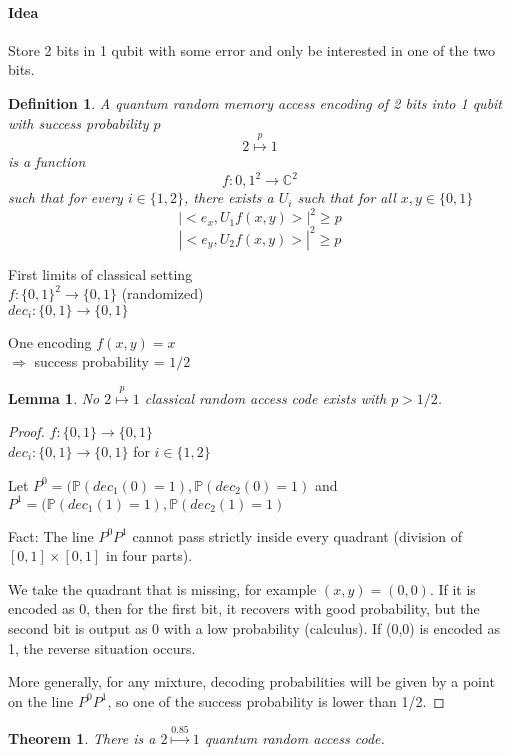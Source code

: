 \documentclass{article}
\newtheorem{thm}{Theorem}
\newtheorem{lemma}{Lemma}
\newtheorem{defi}{Definition}
\begin{document}
\paragraph{Idea}
Store 2 bits in 1 qubit with some error and only be interested in one of the two bits.

\begin{defi}
A quantum random memory access encoding of 2 bits into 1 qubit with success probability $p$
\[2 \overset{p}{\mapsto} 1\]
is a function 
\[f:{0,1}^2\to \mathbb{C}^2\]
such that for every $i\in \{1,2\}$, there exists a $U_i$ such that for all $x,y\in \{0,1\}$
\[|<e_x,U_1f(x,y)>|^2\geq p\]
\[|<e_y,U_2f(x,y)>|^2\geq p\]
\end{defi}



First limits of classical setting\\
$f:\{0,1\}^2\to\{0,1\}$ (randomized)\\
$dec_i:\{0,1\}\to\{0,1\}$

One encoding
$f(x,y)=x$\\
$\Rightarrow$ success probability = $1/2$

\begin{lemma}
No $2\overset{p}{\mapsto} 1$ classical random access code exists with $p>1/2$.
\end{lemma}

\begin{proof}
$f:\{0,1\}\to\{0,1\}$\\
$dec_i: \{0,1\}\to\{0,1\}$ for $i\in \{1,2\}$

Let $P^0=(\mathbb{P}(dec_1(0)=1),\mathbb{P}(dec_2(0)=1)$ and $P^1=(\mathbb{P}(dec_1(1)=1),\mathbb{P}(dec_2(1)=1)$

Fact: The line $P^0P^1$ cannot pass strictly inside every quadrant (division of $[0,1]\times [0,1]$ in four parts).

We take the quadrant that is missing, for example $(x,y)=(0,0)$. If it is encoded as 0, then for the first bit, it recovers with good probability, but the second bit is output as 0 with a low probability (calculus). If (0,0) is encoded as 1, the reverse situation occurs.

More generally, for any mixture, decoding probabilities will be given by a point on the line $P^0P^1$, so one of the success probability is lower than 1/2.
\end{proof}

\begin{thm}
There is a $2 \overset{0.85}{\mapsto} 1$ quantum random access code.
\end{thm}
\end{document}
